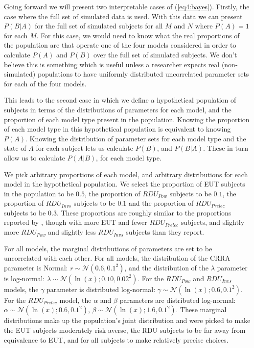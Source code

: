 \documentclass[../main.tex]{subfiles}
\begin{document}
Going forward we will present two interpretable cases of (\ref{eq4:bayes}).
Firstly, the case where the full set of simulated data is used.
With this data we can present $P(B|A)$ for the full set of simulated subjects for all $M$ and $N$ where $P(A) = 1$ for each $M$.
For this case, we would need to know what the real proportions of the population are that operate one of the four models considered in order to calculate $P(A)$ and $P(B)$ over the full set of simulated subjects.
We don't believe this is something which is useful unless a researcher expects real (non-simulated) populations to have uniformly distributed uncorrelated parameter sets for each of the four models.

This leads to the second case in which we define a hypothetical population of subjects in terms of the distributions of parameters for each model, and the proportion of each model type present in the population.
Knowing the proportion of each model type in this hypothetical population is equivalent to knowing $P(A)$.
Knowing the distribution of parameter sets for each model type and the state of $A$ for each subject lets us calculate $P(B)$, and $P(B|A)$.
These in turn allow us to calculate $P(A|B)$, for each model type.

We pick arbitrary proportions of each model, and arbitrary distributions for each model in the hypothetical population.
We select the proportion of EUT subjects in the population to be $0.5$, the proportion of $\mathit{RDU_{Pow}}$ subjects to be $0.1$, the proportion of $\mathit{RDU_{Invs}}$ subjects to be $0.1$ and the proportion of $\mathit{RDU_{Prelec}}$ subjects to be $0.3$.
These proportions are roughly similar to the proportions reported by \textcite[108]{Harrison2016}, though with more EUT and fewer $\mathit{RDU_{Prelec}}$ subjects, and slightly more $\mathit{RDU_{Pow}}$ and slightly less $\mathit{RDU_{Invs}}$ subjects than they report.

For all models, the marginal distributions of parameters are set to be uncorrelated with each other.
For all models, the distribution of the CRRA parameter is Normal: $r \sim \mathcal{N}(0.6, 0.1^2)$, and the distribution of the $\lambda$ parameter is log-normal: $\lambda \sim \mathcal{N}(\ln(x);0.10, 0.02^2)$.
For the $\mathit{RDU_{Pow}}$ and $\mathit{RDU_{Invs}}$ models, the $\gamma$ parameter is distributed log-normal: $\gamma \sim \mathcal{N}(\ln(x);0.6, 0.1^2)$.
For the $\mathit{RDU_{Prelec}}$ model, the $\alpha$ and $\beta$ parameters are distributed log-normal: $\alpha \sim \mathcal{N}(\ln(x);0.6, 0.1^2)$, $\beta \sim \mathcal{N}(\ln(x);1.6, 0.1^2)$.
These marginal distributions make up the population's joint distribution and were picked to make the EUT subjects moderately risk averse, the RDU subjects to be far away from equivalence to EUT, and for all subjects to make relatively precise choices.
\end{document}
